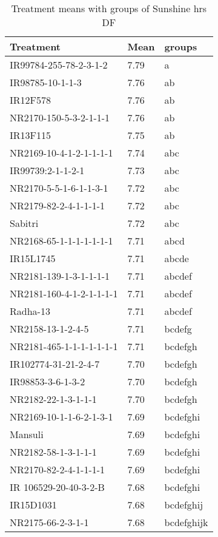 \documentclass[]{article}
\begin{document}
\begin{longtable}{lll}
\caption{\label{tab:two-fac-groups-tab-agroclimate-normal}Treatment means with groups of Sunshine hrs DF}\\
\toprule
Treatment & Mean & groups\\
\midrule
\rowcolor{gray!6}  IR99784-255-78-2-3-1-2 & 7.79 & a\\
IR98785-10-1-1-3 & 7.76 & ab\\
\rowcolor{gray!6}  IR12F578 & 7.76 & ab\\
NR2170-150-5-3-2-1-1-1 & 7.76 & ab\\
\rowcolor{gray!6}  IR13F115 & 7.75 & ab\\
\addlinespace
NR2169-10-4-1-2-1-1-1-1 & 7.74 & abc\\
\rowcolor{gray!6}  IR99739:2-1-1-2-1 & 7.73 & abc\\
NR2170-5-5-1-6-1-1-3-1 & 7.72 & abc\\
\rowcolor{gray!6}  NR2179-82-2-4-1-1-1-1 & 7.72 & abc\\
Sabitri & 7.72 & abc\\
\addlinespace
\rowcolor{gray!6}  NR2168-65-1-1-1-1-1-1-1 & 7.71 & abcd\\
IR15L1745 & 7.71 & abcde\\
\rowcolor{gray!6}  NR2181-139-1-3-1-1-1-1 & 7.71 & abcdef\\
NR2181-160-4-1-2-1-1-1-1 & 7.71 & abcdef\\
\rowcolor{gray!6}  Radha-13 & 7.71 & abcdef\\
\addlinespace
NR2158-13-1-2-4-5 & 7.71 & bcdefg\\
\rowcolor{gray!6}  NR2181-465-1-1-1-1-1-1-1 & 7.71 & bcdefgh\\
IR102774-31-21-2-4-7 & 7.70 & bcdefgh\\
\rowcolor{gray!6}  IR98853-3-6-1-3-2 & 7.70 & bcdefgh\\
NR2182-22-1-3-1-1-1 & 7.70 & bcdefgh\\
\addlinespace
\rowcolor{gray!6}  NR2169-10-1-1-6-2-1-3-1 & 7.69 & bcdefghi\\
Mansuli & 7.69 & bcdefghi\\
\rowcolor{gray!6}  NR2182-58-1-3-1-1-1 & 7.69 & bcdefghi\\
NR2170-82-2-4-1-1-1-1 & 7.69 & bcdefghi\\
\rowcolor{gray!6}  IR 106529-20-40-3-2-B & 7.68 & bcdefghi\\
\addlinespace
IR15D1031 & 7.68 & bcdefghij\\
\rowcolor{gray!6}  NR2175-66-2-3-1-1 & 7.68 & bcdefghijk\\

\end{longtable}
\end{document}
